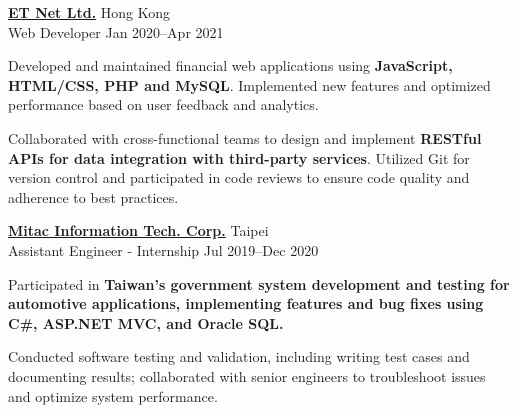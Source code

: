 \begin{entrylist}
    \item \textbf{\href{https://www.etnet.com.hk/}{ET Net Ltd.}} \hfill Hong Kong\\
    Web Developer \hfill Jan 2020--Apr 2021\\
    \begin{detaillist}
        \item Developed and maintained financial web applications using \textbf{JavaScript, HTML/CSS, PHP and MySQL}. Implemented new features and optimized performance based on user feedback and analytics.
        \item Collaborated with cross-functional teams to design and implement \textbf{RESTful APIs for data integration with third-party services}. Utilized Git for version control and participated in code reviews to ensure code quality and adherence to best practices.
    \end{detaillist}

    \item \textbf{\href{https://www.mitac.com.tw/}{Mitac Information Tech. Corp.}} \hfill Taipei\\
    Assistant Engineer - Internship \hfill Jul 2019--Dec 2020\\

    \begin{detaillist}
    \item Participated in \textbf{Taiwan's government system development and testing for automotive applications, implementing features and bug fixes using C\#, ASP.NET MVC, and Oracle SQL.}
    \item Conducted software testing and validation, including writing test cases and documenting results; collaborated with senior engineers to troubleshoot issues and optimize system performance.
    \end{detaillist}

\end{entrylist}
